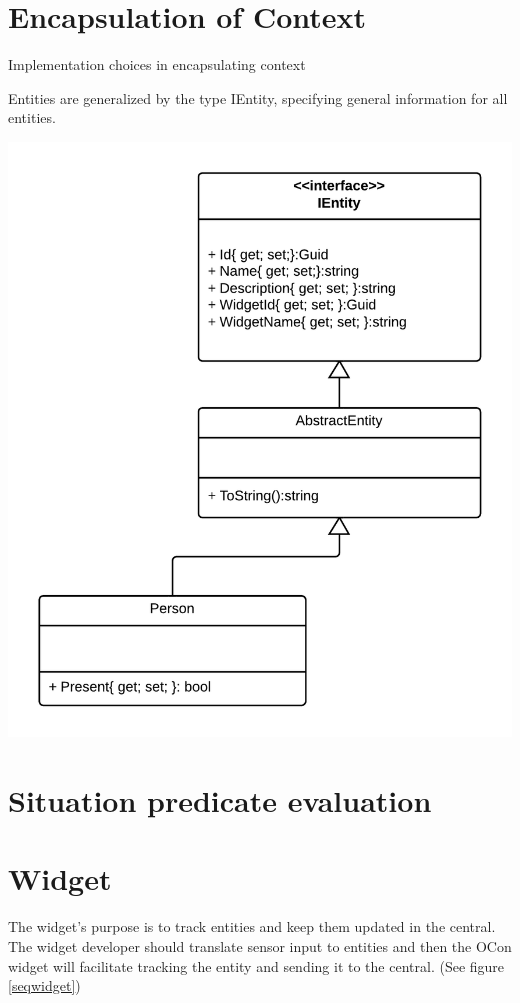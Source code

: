 \documentclass[../report.tex]{subfiles}
\begin{document}
\section{Encapsulation of Context}
Implementation choices in encapsulating context

Entities are generalized by the type IEntity, specifying general information for all entities.


\begin{center}
\includegraphics[scale=0.15]{ContextClassDiagram.png}
\end{center}

\section{Situation predicate evaluation}

\section{Widget}

The widget's purpose is to track entities and keep them updated in the central. The widget developer should translate sensor input to entities and then the OCon widget will facilitate tracking the entity and sending it to the central. (See figure \ref{seqwidget})
\end{document}
